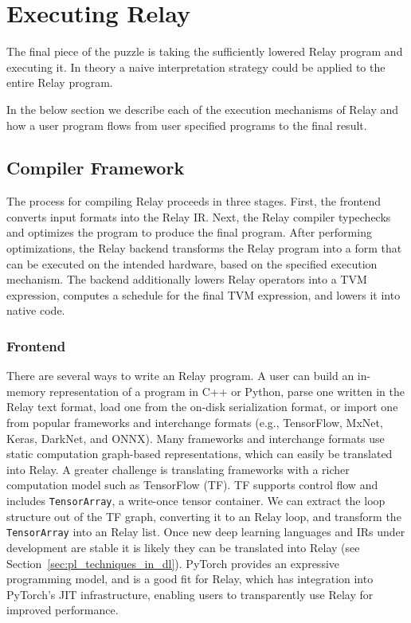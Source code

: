 \chapter{Executing Relay}
\label{ch:execute}

The final piece of the puzzle is taking the sufficiently
    lowered Relay program and executing it.
In theory a naive interpretation strategy could be applied
    to the entire Relay program.

In the below section we describe each of the execution
    mechanisms of Relay and how a user program flows
    from user specified programs to the final result.

\section{Compiler Framework}

The process for compiling Relay proceeds in three stages.
First, the frontend converts input formats into the Relay IR.
Next, the Relay compiler typechecks and optimizes the program
    to produce the final program.
After performing optimizations,
    the Relay backend transforms
    the Relay program into a form that can be executed on
    the intended hardware, based on the specified execution mechanism.
The backend additionally lowers Relay operators into a TVM expression,
    computes a schedule for the final TVM expression, and lowers it into
    native code.

\subsection{Frontend}

There are several ways to write an Relay program.
A user can build an in-memory representation of
    a program in C++ or Python,
    parse one written in the Relay text format,
    load one from the on-disk serialization format,
    or import one from popular frameworks and interchange formats
    (e.g., TensorFlow, MxNet, Keras, DarkNet, and ONNX).
Many frameworks and interchange formats use static computation graph-based representations,
    which can easily be translated into Relay.
A greater challenge is translating frameworks
    with a richer computation model such as TensorFlow (TF).
TF supports control flow and includes \verb|TensorArray|, a write-once
    tensor container.
We can extract the loop structure out of the TF graph, converting
    it to an Relay loop, and transform the \verb|TensorArray| into an Relay list.
Once new deep learning languages and IRs under development
    are stable it is likely they can be translated into Relay (see
    Section~\ref{sec:pl_techniques_in_dl}).
PyTorch provides an expressive programming model, and is a good fit
    for Relay, which has integration into PyTorch's JIT infrastructure,
    enabling users to transparently use Relay for improved performance.

